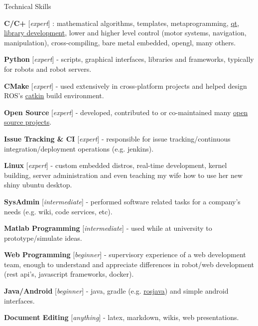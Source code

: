 \documentclass[a4paper,10pt]{article}
\begin{document}
\begin{cvsection}{Technical Skills}
 \raggedright
  \begin{djs_itemize}
    \item \textbf{C/C+} [\textit{expert}] : mathematical algorithms, templates, metaprogramming, \href{https://github.com/Itseez/opencv/pull/3194}{qt}, \href{https://github.com/stonier/ecl_core}{library development}, lower and higher level control (motor systems, navigation, manipulation), cross-compiling, bare metal embedded, opengl, many others.
    \item \textbf{Python} [\textit{expert}] - scripts, graphical interfaces, libraries and frameworks, typically for robots and robot servers.
    \item \textbf{CMake} [\textit{expert}] - used extensively in cross-platform projects and helped design ROS's \href{https://github.com/ros/catkin}{catkin} build environment.
    \item \textbf{Open Source} [\textit{expert}] - developed, contributed to or co-maintained many \href{https://github.com/stonier}{open source projects}.
    \item \textbf{Issue Tracking \& CI} [\textit{expert}] - responsible for issue tracking/continuous integration/deployment operations (e.g. jenkins).
    \item \textbf{Linux} [\textit{expert}] - custom embedded distros, real-time development, kernel building, server administration and even teaching my wife how to use her new shiny ubuntu desktop.
    \item \textbf{SysAdmin} [\textit{intermediate}] - performed software related tasks for a company's needs (e.g. wiki, code services, etc).
    \item \textbf{Matlab Programming} [\textit{intermediate}] - used while at university to prototype/simulate ideas.
    \item \textbf{Web Programming} [\textit{beginner}] - supervisory experience of a web development team, enough to understand and appreciate differences in robot/web development (rest api's, javascript frameworks, docker).
    \item \textbf{Java/Android} [\textit{beginner}] - java, gradle (e.g. \href{https://github.com/rosjava}{rosjava}) and simple android interfaces.
    \item \textbf{Document Editing} [\textit{anything}] - latex, markdown, wikis, web presentations.
  \end{djs_itemize}
\end{cvsection}
\end{document}
